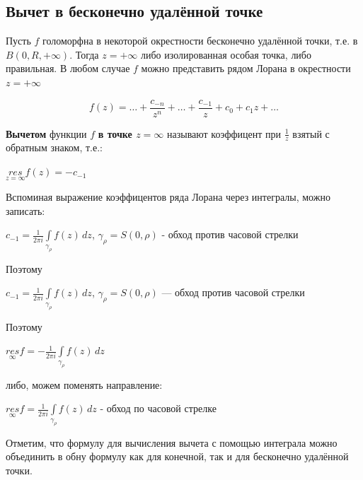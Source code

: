 \documentclass[a4paper, 12pt]{report}
\begin{document}
\subsection{Вычет в бесконечно удалённой точке}
Пусть $f$ голоморфна в некоторой окрестности бесконечно удалённой точки, т.е. в $B(0, R, +\infty)$. Тогда $z = +\infty$ либо изолированная особая точка, либо правильная. В любом случае $f$ можно представить рядом Лорана в окрестности $z = +\infty$ 

    $$f(z) = \dots + \frac{c_{-n}}{z^n} + \dots + \frac{c_{-1}}{z} + c_0 + c_1 z + \dots$$

\textbf{Вычетом} функции $f$ \textbf{в точке $z = \infty$} называют коэффицент при $\frac{1}{z}$ взятый с обратным знаком, т.е.: 
\par\bigskip
\begin{center}
    $\underset{z = \infty}{res} f(z) = - c_{-1}$
\end{center}
\par\bigskip
Вспоминая выражение коэффицентов ряда Лорана через интегралы, можно записать:
\par\bigskip
\begin{center}
    $c_{-1} = \frac{1}{2 \pi i} \int\limits_{\gamma_\rho} f(z) \, dz$, $\gamma_\rho = S(0, \rho)$ - обход против часовой стрелки
\end{center}
\par\bigskip
Поэтому
\par\bigskip
\begin{center}
    $c_{-1} = \frac{1}{2 \pi i} \int\limits_{\gamma_\rho} f(z) \, dz$, $\gamma_\rho = S(0, \rho)$ --- обход против часовой стрелки
\end{center}
\par\bigskip
Поэтому
\par\bigskip
\begin{center}
    $\underset{\infty}{res} f = - \frac{1}{2 \pi i} \int\limits_{\gamma_\rho} f(z) \, dz$
\end{center}
\par\bigskip
либо, можем поменять направление:
\par\bigskip
\begin{center}
    $\underset{\infty}{res} f = \frac{1}{2 \pi i} \int\limits_{\gamma_\rho} f(z) \, dz$ - обход по часовой стрелке
\end{center}
\par\bigskip
Отметим, что формулу для вычисления вычета с помощью интеграла можно объединить в обну формулу как для конечной, так и для бесконечно удалённой точки.
\end{document}
